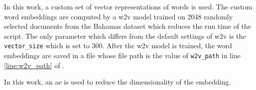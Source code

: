 
In this work, a custom set of vector representations of words is used.
The custom word embeddings are computed by a \ac{w2v} model trained on 2048 randomly selected documents from the Bahamas dataset 
which reduces the run time of the script.
The only parameter which differs from the default settings of \ac{w2v} is the \texttt{vector\_size} which is set to 300.
After the \ac{w2v} model is trained, the word embeddings are saved in a file 
whose file path is the value of \texttt{w2v\_path} in line \ref{line:w2v_path} of .

In this work, an \ac{ae} is used to reduce the dimensionality of the \infersent{} embedding.
